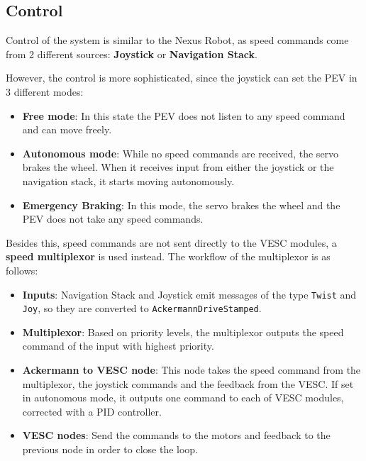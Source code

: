 \subsection{Control}

Control of the system is similar to the Nexus Robot, as speed commands come from 2 different sources: \textbf{Joystick} or \textbf{Navigation Stack}.

However, the control is more sophisticated, since the joystick can set the PEV in 3 different modes:
\begin{itemize}
  \item \textbf{Free mode}: In this state the PEV does not listen to any speed command and can move freely.

  \item \textbf{Autonomous mode}: While no speed commands are received, the servo brakes the wheel. When it receives input from either the joystick or the navigation stack, it starts moving autonomously.

  \item \textbf{Emergency Braking}: In this mode, the servo brakes the wheel and the PEV does not take any speed commands.
\end{itemize}

Besides this, speed commands are not sent directly to the VESC modules, a \textbf{speed multiplexor} is used instead. The workflow of the multiplexor is as follows:
\begin{itemize}
  \item \textbf{Inputs}: Navigation Stack and Joystick emit messages of the type \texttt{Twist} and \texttt{Joy}, so they are converted to \texttt{AckermannDriveStamped}.
  
  \item \textbf{Multiplexor}: Based on priority levels, the multiplexor outputs the speed command of the input with highest priority.

  \item \textbf{Ackermann to VESC node}: This node takes the speed command from the multiplexor, the joystick commands and the feedback from the VESC. If set in autonomous mode, it outputs one command to each of VESC modules, corrected with a PID controller.

  \item \textbf{VESC nodes}: Send the commands to the motors and feedback to the previous node in order to close the loop.
\end{itemize}

